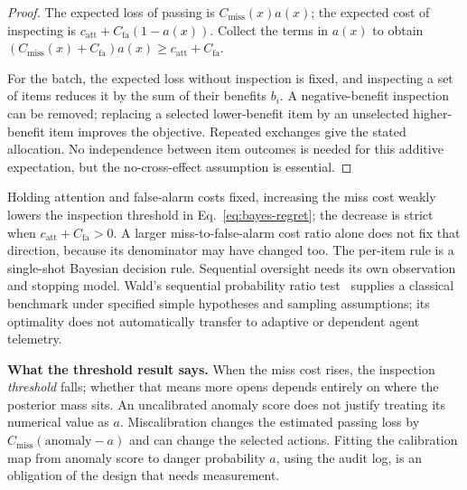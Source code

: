 \documentclass[11pt,a4paper]{article}
\theoremstyle{definition}
\theoremstyle{plain}
\begin{document}
\begin{proof}
\setlength{\parskip}{4pt plus 1pt}
The expected loss of passing is $C_{\mathrm{miss}}(x)a(x)$; the expected cost of
inspecting is $c_{\mathrm{att}}+C_{\mathrm{fa}}(1-a(x))$. Collect the terms in $a(x)$
to obtain $(C_{\mathrm{miss}}(x)+C_{\mathrm{fa}})a(x)\ge
c_{\mathrm{att}}+C_{\mathrm{fa}}$.

For the batch, the expected loss without inspection is fixed, and inspecting
a set of items reduces it by the sum of their benefits $b_i$. A negative-benefit inspection can
be removed; replacing a selected lower-benefit item by an unselected
higher-benefit item improves the objective. Repeated exchanges give the
stated allocation. No independence between item outcomes is needed for this
additive expectation, but the no-cross-effect assumption is essential.
\end{proof}

Holding attention and false-alarm costs fixed, increasing the miss cost
weakly lowers the inspection threshold in Eq.~\ref{eq:bayes-regret}; the decrease
is strict when $c_{\mathrm{att}}+C_{\mathrm{fa}}>0$. A larger miss-to-false-alarm
cost ratio alone does not fix that direction, because its denominator
may have changed too. The per-item rule is a single-shot Bayesian decision rule. Sequential
oversight needs its own observation and stopping model. Wald's sequential
probability ratio test~ supplies a classical benchmark under
specified simple hypotheses and sampling assumptions; its optimality does
not automatically transfer to adaptive or dependent agent telemetry.



\noindent\textbf{What the threshold result says.} When the miss cost rises, the
inspection \emph{threshold} falls; whether that means more opens depends entirely
on where the posterior mass sits. An uncalibrated anomaly score does not justify treating its numerical
value as $a$. Miscalibration changes the estimated passing loss by
$C_{\mathrm{miss}}(\mathrm{anomaly}-a)$ and can change the selected actions.
Fitting the calibration map from anomaly score to danger probability $a$, using the audit log, is an obligation of the design that needs measurement.
\end{document}
